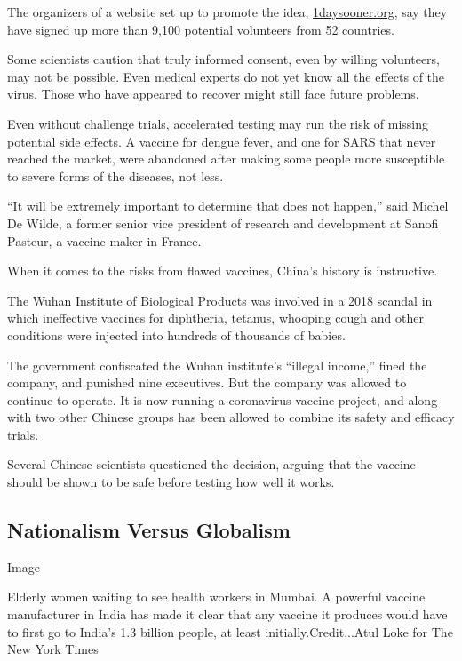 The organizers of a website set up to promote the idea,
\href{https://1daysooner.org/}{1daysooner.org}, say they have signed up
more than 9,100 potential volunteers from 52 countries.

Some scientists caution that truly informed consent, even by willing
volunteers, may not be possible. Even medical experts do not yet know
all the effects of the virus. Those who have appeared to recover might
still face future problems.

Even without challenge trials, accelerated testing may run the risk of
missing potential side effects. A vaccine for dengue fever, and one for
SARS that never reached the market, were abandoned after making some
people more susceptible to severe forms of the diseases, not less.

``It will be extremely important to determine that does not happen,''
said Michel De Wilde, a former senior vice president of research and
development at Sanofi Pasteur, a vaccine maker in France.

When it comes to the risks from flawed vaccines, China's history is
instructive.

The Wuhan Institute of Biological Products was involved in a 2018
scandal in which ineffective vaccines for diphtheria, tetanus, whooping
cough and other conditions were injected into hundreds of thousands of
babies.

The government confiscated the Wuhan institute's ``illegal income,''
fined the company, and punished nine executives. But the company was
allowed to continue to operate. It is now running a coronavirus vaccine
project, and along with two other Chinese groups has been allowed to
combine its safety and efficacy trials.

Several Chinese scientists questioned the decision, arguing that the
vaccine should be shown to be safe before testing how well it works.

\hypertarget{nationalism-versus-globalism}{%
\subsection{Nationalism Versus
Globalism}\label{nationalism-versus-globalism}}

Image

Elderly women waiting to see health workers in Mumbai. A powerful
vaccine manufacturer in India has made it clear that any vaccine it
produces would have to first go to India's 1.3 billion people, at least
initially.Credit...Atul Loke for The New York Times

